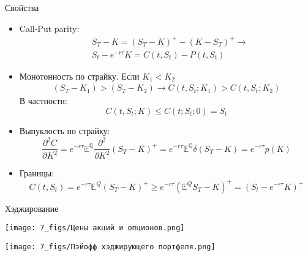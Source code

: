 \documentclass{beamer}
\begin{document}
\begin{frame}{Свойства}
    \begin{itemize}
        \item<1-> Call-Put parity:
        \begin{align*}
            &S_T - K = (S_T - K)^+ - (K - S_T)^+ \to \\
            &S_t - e^{-r \tau} K = C(t, S_t) - P(t, S_t)
        \end{align*}

        \item<2-> Монотонность по страйку. Если $K_1 < K_2$
        \begin{align*}
               (S_T - K_1) > (S_T - K_2) \to C(t, S_t; K_1) > C(t, S_t; K_2) 
        \end{align*}В частности:
        $$
            C(t, S_t; K) \leq C(t; S_t; 0) = S_t
        $$

        \item<3-> Выпуклость по страйку:
        $$
            \dfrac{\partial^2 C}{\partial K^2} = e^{-r\tau} \mathbb{E}^{\mathbb{Q}} \dfrac{\partial^2}{\partial K^2} (S_T - K)^+ =
            e^{-r\tau} \mathbb{E}^{\mathbb{Q}} \delta(S_T - K) = e^{-r\tau} p(K)
        $$

        \item<4-> Границы:
        $$
            C(t, S_t) = e^{-r\tau}\mathbb{E}^Q (S_T - K)^+ \geq e^{-r\tau} (\mathbb{E}^Q S_T - K)^+ = (S_t - e^{-r\tau} K)^+
        $$
    \end{itemize}

    
    
\end{frame}

\begin{frame}{Хэджирование}

    \begin{center}
        \texttt{[image: 7\_figs/Цены акций и опционов.png]}
    \end{center}

    \pause
    
    \begin{center}
        \texttt{[image: 7\_figs/Пэйофф хэджирующего портфеля.png]}
    \end{center}
    
\end{frame}
\end{document}
